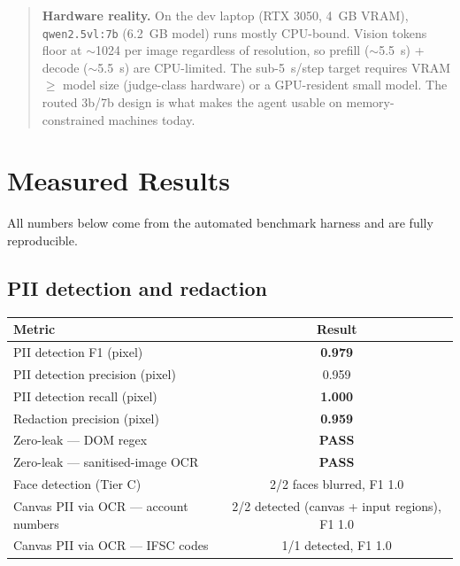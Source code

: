 \documentclass[11pt,a4paper]{article}
\newcommand{\code}[1]{\texttt{#1}}
\begin{document}
\begin{quote}
\textbf{Hardware reality.} On the dev laptop (RTX 3050, 4~GB VRAM), \code{qwen2.5vl:7b} (6.2~GB model) runs mostly CPU-bound. Vision tokens floor at $\sim$1024 per image regardless of resolution, so prefill ($\sim$5.5~s) + decode ($\sim$5.5~s) are CPU-limited. The sub-5~s/step target requires VRAM $\geq$ model size (judge-class hardware) or a GPU-resident small model. The routed 3b/7b design is what makes the agent usable on memory-constrained machines today.
\end{quote}

\section{Measured Results}

All numbers below come from the automated benchmark harness and are fully reproducible.

\subsection{PII detection and redaction}

\begin{table}[H]
\centering
\small
\begin{tabularx}{\textwidth}{@{}>{\raggedright\arraybackslash}p{8.4cm} c@{}}
\toprule
\textbf{Metric} & \textbf{Result}\\
\midrule
PII detection F1 (pixel) & \textbf{0.979}\\
PII detection precision (pixel) & 0.959\\
PII detection recall (pixel) & \textbf{1.000}\\
Redaction precision (pixel) & \textbf{0.959}\\
Zero-leak --- DOM regex & \textcolor{good}{\textbf{PASS}}\\
Zero-leak --- sanitised-image OCR & \textcolor{good}{\textbf{PASS}}\\
Face detection (Tier C) & 2/2 faces blurred, F1 1.0\\
Canvas PII via OCR --- account numbers & 2/2 detected (canvas + input regions), F1 1.0\\
Canvas PII via OCR --- IFSC codes & 1/1 detected, F1 1.0\\
\bottomrule
\end{tabularx}
\end{table}
\end{document}
